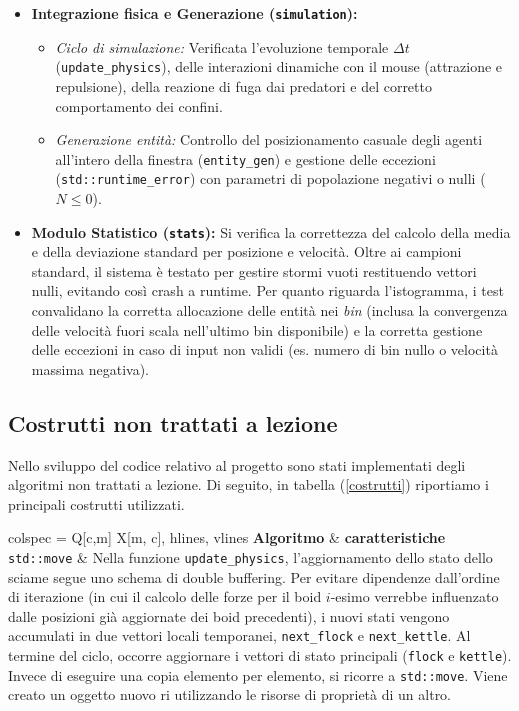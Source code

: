 \documentclass[11pt, a4paper]{article}
\begin{document}
\begin{itemize}
    \item \textbf{Integrazione fisica e Generazione (\texttt{simulation}):}
    \begin{itemize}
        \item \textit{Ciclo di simulazione:} Verificata l'evoluzione temporale $\Delta t$ (\texttt{update\_physics}), delle interazioni dinamiche con il mouse (attrazione e repulsione), della reazione di fuga dai predatori e del corretto comportamento dei confini.
        \item \textit{Generazione entità:} Controllo del posizionamento casuale degli agenti all'intero della finestra (\texttt{entity\_gen}) e gestione delle eccezioni (\texttt{std::runtime\_error}) con parametri di popolazione negativi o nulli ($N \le 0$).
    \end{itemize}

    \item \textbf{Modulo Statistico (\texttt{stats}):}
    Si verifica la correttezza del calcolo della media e della deviazione standard per posizione e velocità. Oltre ai campioni standard, il sistema è testato per gestire stormi vuoti restituendo vettori nulli, evitando così crash a runtime. Per quanto riguarda l'istogramma, i test convalidano la corretta allocazione delle entità nei \textit{bin} (inclusa la convergenza delle velocità fuori scala nell'ultimo bin disponibile) e la corretta gestione delle eccezioni in caso di input non validi (es. numero di bin nullo o velocità massima negativa).
\end{itemize}
\subsection{Costrutti non trattati a lezione}
Nello sviluppo del codice relativo al progetto sono stati implementati degli algoritmi non trattati a lezione. Di seguito, in tabella (\ref{costrutti}) riportiamo i principali costrutti utilizzati.
\begin{table}[H]
    \centering
    \caption{Algoritmi non trattati a lezione}
    \label{costrutti}
\begin{tblr}{
  colspec = {Q[c,m] X[m, c]},
  hlines, vlines}
  \textbf{Algoritmo} & \textbf{caratteristiche} \\ \hline
  \texttt{std::move} & Nella funzione \texttt{update\_physics}, l'aggiornamento dello stato dello sciame segue uno schema di double buffering. Per evitare dipendenze dall'ordine di iterazione (in cui il calcolo delle forze per il boid $i$-esimo verrebbe influenzato dalle posizioni già aggiornate dei boid precedenti), i nuovi stati vengono accumulati in due vettori locali temporanei, \texttt{next\_flock} e \texttt{next\_kettle}. Al termine del ciclo, occorre aggiornare i vettori di stato principali (\texttt{flock} e \texttt{kettle}). Invece di eseguire una copia elemento per elemento, si ricorre a \texttt{std::move}. Viene creato un oggetto nuovo ri utilizzando le risorse di proprietà di un altro. \\
\end{tblr}
\end{table}
\end{document}
